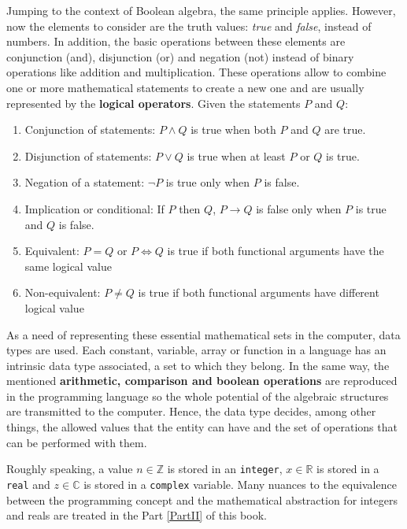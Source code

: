 \newpage
Jumping to the context of Boolean algebra, the same principle applies.
However, now the elements to consider are the truth values: \textit{true} and \textit{false}, instead of numbers.
In addition, the basic operations between these elements are conjunction (and), disjunction (or) and negation (not) 
instead of binary operations like addition and multiplication.
These operations allow to combine one or more mathematical statements to create a new one 
and are usually represented by the \textbf{logical operators}.
Given the statements $P$ and $Q$:
\begin{enumerate}[noitemsep]
    \item Conjunction of statements: $P \land Q$ is true when both $P$ and $Q$ are true.
    \item Disjunction of statements: $P\lor Q$ is true when at least $P$ or $Q$ is true.
    \item Negation of a statement: $\neg P$ is true only when $P$ is false.
    \item Implication or conditional: If $P$ then $Q$, $P\to Q$ is false only when $P$ is true and $Q$ is false. 
    \item Equivalent: $P = Q$ or $P \iff Q$ is true if both functional arguments have the same logical value
    \item Non-equivalent: $P \neq Q$ is true if both functional arguments have different logical value
\end{enumerate}


 

As a need of representing these essential mathematical sets in the computer, data types are used. 
Each constant, variable, array or function in a language has an intrinsic data type associated, a set to which they belong. 
In the same way, the mentioned \textbf{arithmetic, comparison and boolean operations} are reproduced in the programming language 
so the whole potential of the algebraic structures are transmitted to the computer. 
Hence, the data type decides, among other things, the allowed values that the entity can have and the set of operations that can be performed with them.

Roughly speaking, a value $n\in \mathbb{Z}$ is stored in an \texttt{integer}, 
$x\in \mathbb{R}$ is stored in a \texttt{real} and 
$z\in \mathbb{C}$ is stored in a \texttt{complex} variable.
Many nuances to the equivalence between the programming concept and the mathematical abstraction 
for integers and reals are treated in the Part \ref{PartII} of this book. 

